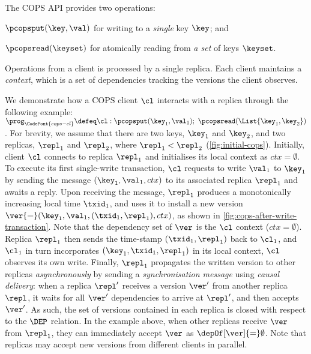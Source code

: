 The COPS API provides two operations: \begin{enumerate*}
\item \( \pcopsput(\key,\val) \) for writing to a \emph{single}
key $\key$; and \item  \( \pcopsread(\keyset) \) for atomically reading from \emph{a set} of keys  $\keyset$.  
\end{enumerate*}
Operations from a client is processed by a single replica. 
Each client maintains a \emph{context}, which is a set of dependencies
tracking the versions the client observes.  

We demonstrate how a COPS client \( \cl \) interacts with a replica through the following example:
\(
    \prog_\CodeFont{cops-cl} \defeq \cl: \pcopsput(\key_1,\val_1) ; \ 
    \pcopsread(\List{\key_1,\key_2})
\).
For brevity, we assume that there are two keys, $\key_1$ and $\key_2$, 
and two replicas, $\repl_1$ and $\repl_2$, where $\repl_1 < \repl_2$ (\cref{fig:initial-cops}).
Initially, client \( \cl \) connects to replica \( \repl_1 \) and initialises its local context as $ctx {=} \emptyset$.
To execute its first single-write transaction, $\cl$ requests to write $\val_1$ to $\key_1$
by sending the message $(\key_1, \val_1, ctx)$ to its associated replica $\repl_1$
and awaits a reply.
Upon receiving the message, $\repl_1$ produces a monotonically increasing local time $\txid_1$, 
and uses it to install  a new version $\ver {=} (\key_1,\val_1, (\txid_1,\repl_1), ctx)$, as shown in \cref{fig:cops-after-write-transaction}.
Note that the dependency set of $\ver$ is the $\cl$ context ($ctx {=} \emptyset$).
Replica $\repl_1$ then sends the time-stamp $(\txid_1,\repl_1)$ back to $\cl_1$, and $\cl_1$ in turn  incorporates $(\key_1, \txid_1,\repl_1)$ in its local context,
\ie $\cl$ observes its own write. 
Finally, $\repl_1$ propagates the written version to other replicas \emph{asynchronously} by sending a \emph{synchronisation message} 
using \emph{causal delivery}:
when a replica $\repl'$ receives a version $\ver'$ from another replica $\repl$, 
it waits for all $\ver'$ dependencies to arrive at $\repl'$, and then accepts $\ver'$.
As such, the set of versions contained in each replica is closed with respect to the \( \DEP \) relation.
In the example above, when other replicas receive $\ver$ from $\repl_1$, they can immediately accept $\ver$ as \( \depOf[\ver]{=}\emptyset\). 
Note that replicas may accept new versions from different clients in parallel.

